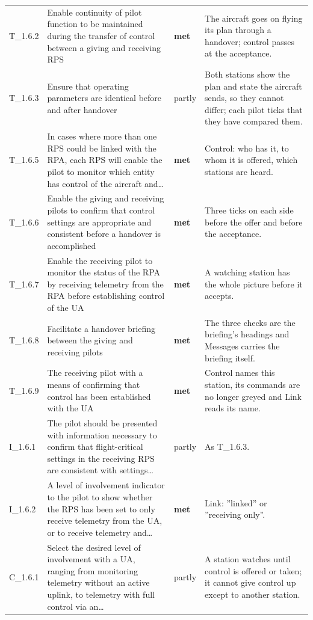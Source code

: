 \begin{longtable}{@{}>{\raggedright\arraybackslash}p{12mm}>{\raggedright\arraybackslash}p{57mm}>{\raggedright\arraybackslash}p{13mm}>{\raggedright\arraybackslash}p{70mm}@{}}
T\_1.6.2 & Enable continuity of pilot function to be maintained during the transfer of control between a giving and receiving RPS & \textbf{met} & The aircraft goes on flying its plan through a handover; control passes at the acceptance. \\
T\_1.6.3 & Ensure that operating parameters are identical before and after handover & partly & Both stations show the plan and state the aircraft sends, so they cannot differ; each pilot ticks that they have compared them. \\
T\_1.6.5 & In cases where more than one RPS could be linked with the RPA, each RPS will enable the pilot to monitor which entity has control of the aircraft and\ldots{} & \textbf{met} & Control: who has it, to whom it is offered, which stations are heard. \\
T\_1.6.6 & Enable the giving and receiving pilots to confirm that control settings are appropriate and consistent before a handover is accomplished & \textbf{met} & Three ticks on each side before the offer and before the acceptance. \\
T\_1.6.7 & Enable the receiving pilot to monitor the status of the RPA by receiving telemetry from the RPA before establishing control of the UA & \textbf{met} & A watching station has the whole picture before it accepts. \\
T\_1.6.8 & Facilitate a handover briefing between the giving and receiving pilots & \textbf{met} & The three checks are the briefing's headings and Messages carries the briefing itself. \\
T\_1.6.9 & The receiving pilot with a means of confirming that control has been established with the UA & \textbf{met} & Control names this station, its commands are no longer greyed and Link reads its name. \\
I\_1.6.1 & The pilot should be presented with information necessary to confirm that flight-critical settings in the receiving RPS are consistent with settings\ldots{} & partly & As T\_1.6.3. \\
I\_1.6.2 & A level of involvement indicator to the pilot to show whether the RPS has been set to only receive telemetry from the UA, or to receive telemetry and\ldots{} & \textbf{met} & Link: ''linked'' or ''receiving only''. \\
C\_1.6.1 & Select the desired level of involvement with a UA, ranging from monitoring telemetry without an active uplink, to telemetry with full control via an\ldots{} & partly & A station watches until control is offered or taken; it cannot give control up except to another station. \\

\end{longtable}
